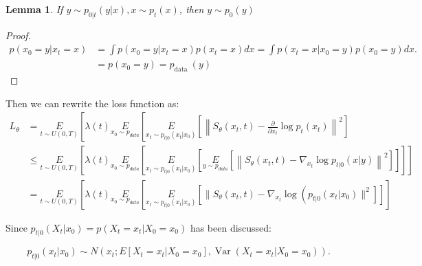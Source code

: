 \documentclass{ctexart}
\newtheorem{proof}{Proof}
\newtheorem{lemma}{Lemma}
\begin{document}
\begin{lemma}
    If  $y \sim p_{0 | t}(y | x), x \sim p_{t}(x)$, then  $y \sim p_{0}(y)$
\end{lemma}
\begin{proof}
    \begin{equation}
        \begin{aligned}
            p\left(x_{0}=y | x_{t}=x\right) & =\int p\left(x_{0}=y | x_{t}=x\right) p\left(x_{t}=x\right) d x=\int p\left(x_{t}=x | x_{0}=y\right) p\left(x_{0}=y\right) d x . \\
            & =p\left(x_{0}=y\right)=p_{\text {data }}(y)
        \end{aligned}
    \end{equation}
\end{proof}
Then we can rewrite the loss function as:
\begin{equation}
    \begin{aligned}
        L_{\theta}&=\underset{t\sim U(0,T)}{E}\left[\lambda(t) \underset{x_{0}\sim p_{data}}{E}\left[\underset{x_{t}\sim p_{t|0}(x_t|x_0)}{E}\left[\left\|S_{\theta}\left(x_{t}, t\right)-\frac{\partial}{\partial x_{t}} \log p_{t}\left(x_{t}\right)\right\|^{2}\right]\right.\right.\\ 
        &\leqslant \underset{t\sim U(0,T)}{E}\left[\lambda(t) \underset{x_{0}\sim p_{data}}{E}\left[\underset{x_{t}\sim p_{t|0}(x_t|x_0)}{E}\left[\underset{y\sim p_{data}}{E}\left[\left\|S_{\theta}\left(x_{t}, t\right)-\nabla_{x_{t}} \log p_{t|0}(x | y)\right\|^{2}\right]\right]\right]\right] \\
        &=\underset{t\sim U(0, T)}{E}\left[\lambda(t) \underset{x_{0}\sim p_{data}}{E}\left[\underset{x_{t}\sim p_{t|0}(x_t|x_0)}{E}\left[\| S_{\theta}\left(x_{t}, t\right)-\nabla_{x_{t}} \log \left(p_{t|0}\left(x_{t} | x_{0}\right) \|^{2}\right]\right]\right]\right.
    \end{aligned}
\end{equation}


Since  $p_{t|0}\left(X_{t} | x_{0}\right)=p\left(X_{t}=x_{t} | X_{0}=x_{0}\right)$  has been discussed:

$$p_{t | 0}\left(x_{t} | x_{0}\right) \sim N\left(x_{t} ; E\left[X_{t}=x_t | X_{0}=x_{0}\right], \operatorname{Var}\left(X_{t}=x_t | X_{0}=x_{0}\right)\right) .$$
\end{document}
